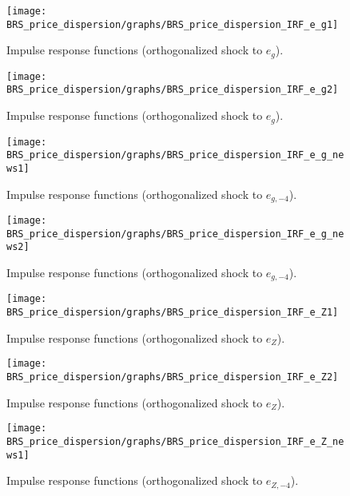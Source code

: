  
\begin{figure}[H]
\centering 
\texttt{[image: BRS\_price\_dispersion/graphs/BRS\_price\_dispersion\_IRF\_e\_g1]}
\caption{Impulse response functions (orthogonalized shock to ${e_g}$).}\label{Fig:IRF:e_g:1}
\end{figure}
 
\begin{figure}[H]
\centering 
\texttt{[image: BRS\_price\_dispersion/graphs/BRS\_price\_dispersion\_IRF\_e\_g2]}
\caption{Impulse response functions (orthogonalized shock to ${e_g}$).}\label{Fig:IRF:e_g:2}
\end{figure}
 
\begin{figure}[H]
\centering 
\texttt{[image: BRS\_price\_dispersion/graphs/BRS\_price\_dispersion\_IRF\_e\_g\_news1]}
\caption{Impulse response functions (orthogonalized shock to ${e_{g,-4}}$).}\label{Fig:IRF:e_g_news:1}
\end{figure}
 
\begin{figure}[H]
\centering 
\texttt{[image: BRS\_price\_dispersion/graphs/BRS\_price\_dispersion\_IRF\_e\_g\_news2]}
\caption{Impulse response functions (orthogonalized shock to ${e_{g,-4}}$).}\label{Fig:IRF:e_g_news:2}
\end{figure}
 
\begin{figure}[H]
\centering 
\texttt{[image: BRS\_price\_dispersion/graphs/BRS\_price\_dispersion\_IRF\_e\_Z1]}
\caption{Impulse response functions (orthogonalized shock to ${e_Z}$).}\label{Fig:IRF:e_Z:1}
\end{figure}
 
\begin{figure}[H]
\centering 
\texttt{[image: BRS\_price\_dispersion/graphs/BRS\_price\_dispersion\_IRF\_e\_Z2]}
\caption{Impulse response functions (orthogonalized shock to ${e_Z}$).}\label{Fig:IRF:e_Z:2}
\end{figure}
 
\begin{figure}[H]
\centering 
\texttt{[image: BRS\_price\_dispersion/graphs/BRS\_price\_dispersion\_IRF\_e\_Z\_news1]}
\caption{Impulse response functions (orthogonalized shock to ${e_{Z,-4}}$).}\label{Fig:IRF:e_Z_news:1}
\end{figure}
 
